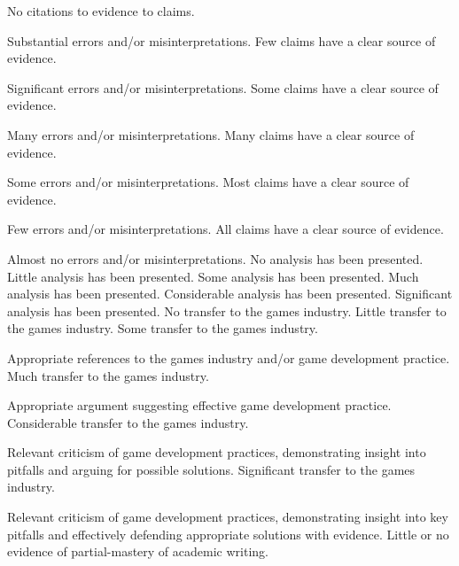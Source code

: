 \documentclass{../fal_assignment}
\begin{document}
\begin{markingrubric}
%
        \grade\fail 	No citations to evidence to claims.
        \par 		Substantial errors and/or misinterpretations.
        \grade 		Few claims have a clear source of evidence.
        \par 		Significant errors and/or misinterpretations.
        \grade 		Some claims have a clear source of evidence.
        \par 		Many errors and/or misinterpretations.
        \grade 		Many claims have a clear source of evidence.
        \par 		Some errors and/or misinterpretations.
        \grade 		Most claims have a clear source of evidence.
        \par 		Few errors and/or misinterpretations.
        \grade 		All claims have a clear source of evidence.
        \par 		Almost no errors and/or misinterpretations.
%
        \grade\fail 	No analysis has been presented.
        \grade 		Little analysis has been presented.
        \grade 		Some analysis has been presented. 
        \grade 		Much analysis has been presented.
        \grade 		Considerable analysis has been presented.
        \grade 		Significant analysis has been presented.
%
        \grade\fail 	No transfer to the games industry.
        \grade 		Little transfer to the games industry.
        \grade 		Some transfer to the games industry. 
        \par 		Appropriate references to the games industry and/or game development practice. 
        \grade 		Much transfer to the games industry.
        \par 		Appropriate argument suggesting effective game development practice. 
        \grade 		Considerable transfer to the games industry.
        \par 		Relevant criticism of game development practices, demonstrating insight into pitfalls and arguing for possible solutions. 
        \grade 		Significant transfer to the games industry.
        \par 		Relevant criticism of game development practices, demonstrating insight into key pitfalls and effectively defending appropriate solutions with evidence. 
%
        \grade\fail 	Little or no evidence of partial-mastery of academic writing.

\end{markingrubric}
\end{document}
